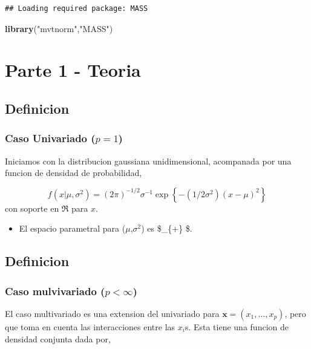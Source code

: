 \documentclass[11pt,]{article}
\newenvironment{Shaded}{\begin{snugshade}}{\end{snugshade}}
\newcommand{\KeywordTok}[1]{\textcolor[rgb]{0.13,0.29,0.53}{\textbf{#1}}}
\newcommand{\StringTok}[1]{\textcolor[rgb]{0.31,0.60,0.02}{#1}}
\newcommand{\NormalTok}[1]{#1}
\providecommand{\tightlist}{%
\setlength{\itemsep}{0pt}\setlength{\parskip}{0pt}}
\begin{document}
\begin{verbatim}
## Loading required package: MASS
\end{verbatim}

\begin{Shaded}
\begin{Highlighting}[]
\KeywordTok{library}\NormalTok{(}\StringTok{"mvtnorm"}\NormalTok{,}\StringTok{"MASS"}\NormalTok{)}
\end{Highlighting}
\end{Shaded}

\section{Parte 1 - Teoria}\label{parte-1---teoria}

\subsection{Definicion}\label{definicion}

\subsubsection{\texorpdfstring{Caso Univariado
(\(p=1\))}{Caso Univariado (p=1)}}\label{caso-univariado-p1}

Iniciamos con la distribucion gaussiana unidimensional, acompanada por
una funcion de densidad de probabilidad,

\[
f(x|\mu,\sigma^2)
= 
(2\pi)^{-1/2} \sigma^{-1} \exp\left\{-(1/2\sigma^2) (x-\mu)^2\right\}
\] con soporte en \(\Re\) para \(x\).

\begin{itemize}
\tightlist
\item
  El espacio parametral para (\(\mu\),\(\sigma^2\)) es
  \$\Re \times \Re\_\{+\} \$.
\end{itemize}

\subsection{Definicion}\label{definicion-1}

\subsubsection{\texorpdfstring{Caso mulvivariado
(\(p<\infty\))}{Caso mulvivariado (p\textless{}\textbackslash{}infty)}}\label{caso-mulvivariado-pinfty}

El caso multivariado es una extension del univariado para
\(\boldsymbol{x}=(x_1,\ldots,x_p)\), pero que toma en cuenta las
interacciones entre las \(x_i\)s. Esta tiene una funcion de densidad
conjunta dada por,
\end{document}
